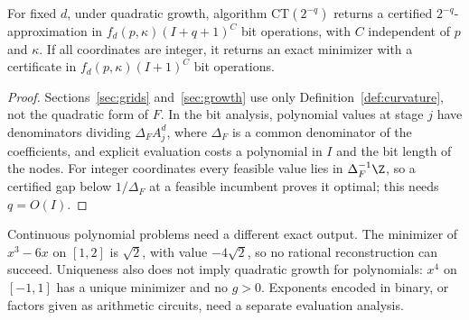 \begin{corollary}\label{cor:poly}
For fixed $d$, under quadratic growth, algorithm CT$(2^{-q})$ returns a
certified $2^{-q}$-approximation in $f_d(p,\kappa)(I+q+1)^{C}$ bit
operations, with $C$ independent of $p$ and $\kappa$. If all coordinates are
integer, it returns an exact minimizer with a certificate in
$f_d(p,\kappa)(I+1)^{C}$ bit operations.
\end{corollary}

\begin{proof}
Sections~\ref{sec:grids} and~\ref{sec:growth} use only
Definition~\ref{def:curvature}, not the quadratic form of $F$. In the bit
analysis, polynomial values at stage $j$ have denominators dividing
$\Delta_FA_j^{d}$, where $\Delta_F$ is a common denominator of the
coefficients, and explicit evaluation costs a polynomial in $I$ and the bit
length of the nodes. For integer coordinates every feasible value lies in
$\Delta_F^{-1}\Z$, so a certified gap below $1/\Delta_F$ at a feasible
incumbent proves it optimal; this needs $q=O(I)$.
\end{proof}

Continuous polynomial problems need a different exact output. The minimizer
of $x^3-6x$ on $[1,2]$ is $\sqrt2$, with value $-4\sqrt2$, so no rational
reconstruction can succeed. Uniqueness also does not imply quadratic growth
for polynomials: $x^4$ on $[-1,1]$ has a unique minimizer and no
$g>0$. Exponents encoded in binary, or factors given as arithmetic circuits,
need a separate evaluation analysis.
